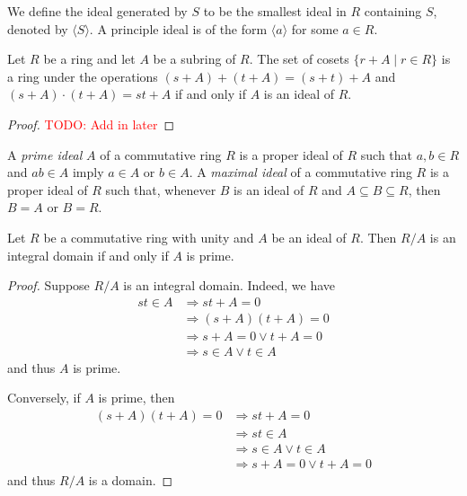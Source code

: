 We define the ideal generated by $S$ to be the smallest ideal in $R$ containing $S$, denoted by $\langle S\rangle$. A principle ideal is of the form $\langle a\rangle$ for some $a\in R$.

\begin{theorem}
    Let $R$ be a ring and let $A$ be a subring of $R$. The set of cosets $\{r + A\mid r\in R\}$ is a ring under the operations $(s + A) + (t + A) = (s + t) + A$ and $(s + A)\cdot (t + A) = st + A$ if and only if $A$ is an ideal of $R$.
\end{theorem}
\begin{proof}
    \textcolor{red}{TODO: Add in later}
\end{proof}

\begin{definition}
    A \textit{prime ideal} $A$ of a commutative ring $R$ is a proper ideal of $R$ such that $a,b\in R$ and $ab\in A$ imply $a\in A$ or $b\in A$. A \textit{maximal ideal} of a commutative ring $R$ is a proper ideal of $R$ such that, whenever $B$ is an ideal of $R$ and $A\subseteq B\subseteq R$, then $B = A$ or $B = R$.
\end{definition}

\begin{theorem}
    Let $R$ be a commutative ring with unity and $A$ be an ideal of $R$. Then $R/A$ is an integral domain if and only if $A$ is prime.
\end{theorem}
\begin{proof}
    Suppose $R/A$ is an integral domain.
    Indeed, we have 
    \begin{align*}
        st \in A &\Rightarrow st + A = 0\\
        &\Rightarrow (s + A)(t + A) = 0\\
        &\Rightarrow s + A = 0 \vee t + A = 0\\
        &\Rightarrow s\in A \vee t\in A
    \end{align*}
    and thus $A$ is prime.

    Conversely, if $A$ is prime, then 
    \begin{align*}
        (s + A)(t + A) = 0 &\Rightarrow st + A = 0\\
        &\Rightarrow st\in A\\
        &\Rightarrow s\in A\vee t\in A\\
        &\Rightarrow s + A = 0\vee t + A = 0
    \end{align*}
    and thus $R/A$ is a domain.
\end{proof}

